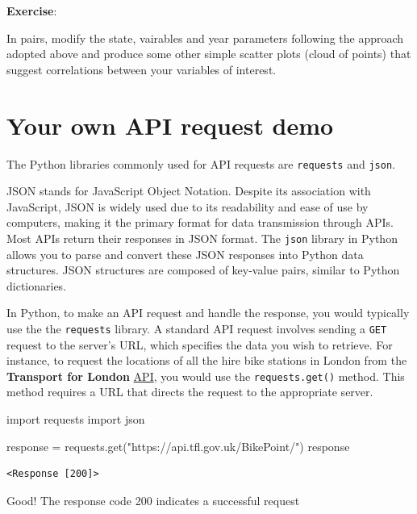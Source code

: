 \documentclass[
  letterpaper,
  DIV=11,
  numbers=noendperiod]{scrreprt}
\newenvironment{Shaded}{\begin{snugshade}}{\end{snugshade}}
\newcommand{\ImportTok}[1]{\textcolor[rgb]{0.00,0.46,0.62}{#1}}
\newcommand{\NormalTok}[1]{\textcolor[rgb]{0.00,0.23,0.31}{#1}}
\newcommand{\OperatorTok}[1]{\textcolor[rgb]{0.37,0.37,0.37}{#1}}
\newcommand{\StringTok}[1]{\textcolor[rgb]{0.13,0.47,0.30}{#1}}
\begin{document}
\textbf{Exercise}:

In pairs, modify the state, vairables and year parameters following the
approach adopted above and produce some other simple scatter plots
(cloud of points) that suggest correlations between your variables of
interest.

\section{Your own API request demo}\label{your-own-api-request-demo}

The Python libraries commonly used for API requests are
\texttt{requests} and \texttt{json}.

JSON stands for JavaScript Object Notation. Despite its association with
JavaScript, JSON is widely used due to its readability and ease of use
by computers, making it the primary format for data transmission through
APIs. Most APIs return their responses in JSON format. The \texttt{json}
library in Python allows you to parse and convert these JSON responses
into Python data structures. JSON structures are composed of key-value
pairs, similar to Python dictionaries.

In Python, to make an API request and handle the response, you would
typically use the the \texttt{requests} library. A standard API request
involves sending a \texttt{GET} request to the server's URL, which
specifies the data you wish to retrieve. For instance, to request the
locations of all the hire bike stations in London from the
\textbf{Transport for London} \href{https://api.tfl.gov.uk}{API}, you
would use the \texttt{requests.get()} method. This method requires a URL
that directs the request to the appropriate server.

\begin{Shaded}
\begin{Highlighting}[]
\ImportTok{import}\NormalTok{ requests}
\ImportTok{import}\NormalTok{ json}

\NormalTok{response }\OperatorTok{=}\NormalTok{ requests.get(}\StringTok{"https://api.tfl.gov.uk/BikePoint/"}\NormalTok{)}
\NormalTok{response}
\end{Highlighting}
\end{Shaded}

\begin{verbatim}
<Response [200]>
\end{verbatim}

Good! The response code 200 indicates a successful request
\end{document}
